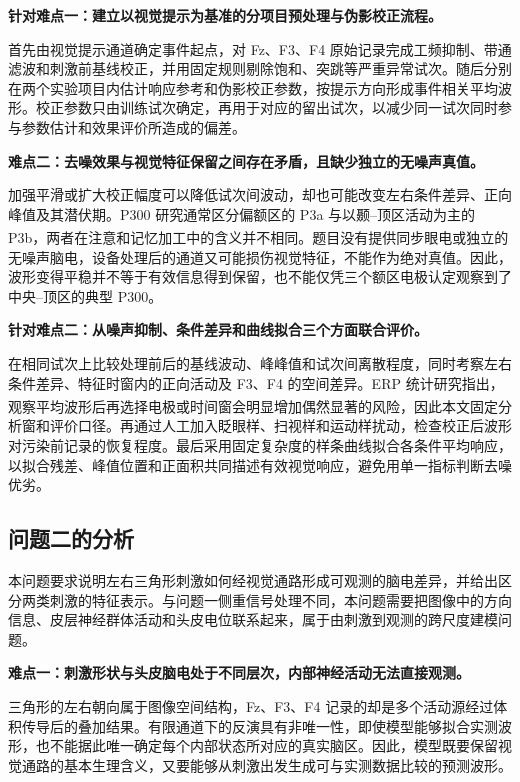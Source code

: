 \documentclass[a4paper]{ctexart}
\numberwithin{figure}{section}       %
\newcommand{\upcite}[1]{\textsuperscript{\cite{#1}}} %
\begin{document}
\noindent\textbf{针对难点一：建立以视觉提示为基准的分项目预处理与伪影校正流程。}

首先由视觉提示通道确定事件起点，对 Fz、F3、F4 原始记录完成工频抑制、带通滤波和刺激前基线校正，并用固定规则剔除饱和、突跳等严重异常试次。随后分别在两个实验项目内估计响应参考和伪影校正参数，按提示方向形成事件相关平均波形。校正参数只由训练试次确定，再用于对应的留出试次，以减少同一试次同时参与参数估计和效果评价所造成的偏差。

\noindent\textbf{难点二：去噪效果与视觉特征保留之间存在矛盾，且缺少独立的无噪声真值。}

加强平滑或扩大校正幅度可以降低试次间波动，却也可能改变左右条件差异、正向峰值及其潜伏期。P300 研究通常区分偏额区的 P3a 与以颞--顶区活动为主的 P3b，两者在注意和记忆加工中的含义并不相同\upcite{polich2007p300}。题目没有提供同步眼电或独立的无噪声脑电，设备处理后的通道又可能损伤视觉特征，不能作为绝对真值。因此，波形变得平稳并不等于有效信息得到保留，也不能仅凭三个额区电极认定观察到了中央--顶区的典型 P300。

\noindent\textbf{针对难点二：从噪声抑制、条件差异和曲线拟合三个方面联合评价。}

在相同试次上比较处理前后的基线波动、峰峰值和试次间离散程度，同时考察左右条件差异、特征时窗内的正向活动及 F3、F4 的空间差异。ERP 统计研究指出，观察平均波形后再选择电极或时间窗会明显增加偶然显著的风险\upcite{luck2017erp}，因此本文固定分析窗和评价口径。再通过人工加入眨眼样、扫视样和运动样扰动，检查校正后波形对污染前记录的恢复程度。最后采用固定复杂度的样条曲线拟合各条件平均响应，以拟合残差、峰值位置和正面积共同描述有效视觉响应，避免用单一指标判断去噪优劣。

\subsection{问题二的分析}

本问题要求说明左右三角形刺激如何经视觉通路形成可观测的脑电差异，并给出区分两类刺激的特征表示。与问题一侧重信号处理不同，本问题需要把图像中的方向信息、皮层神经群体活动和头皮电位联系起来，属于由刺激到观测的跨尺度建模问题。

\noindent\textbf{难点一：刺激形状与头皮脑电处于不同层次，内部神经活动无法直接观测。}

三角形的左右朝向属于图像空间结构，Fz、F3、F4 记录的却是多个活动源经过体积传导后的叠加结果。有限通道下的反演具有非唯一性，即使模型能够拟合实测波形，也不能据此唯一确定每个内部状态所对应的真实脑区。因此，模型既要保留视觉通路的基本生理含义，又要能够从刺激出发生成可与实测数据比较的预测波形。
\end{document}
